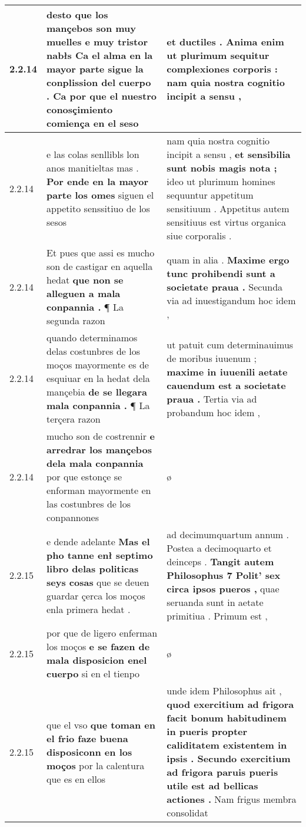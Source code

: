 \begin{tabular}{|p{1cm}|p{6.5cm}|p{6.5cm}|}
2.2.14 & desto que los mançebos son muy muelles e muy tristor nabłs \textbf{ Ca el alma en la mayor parte sigue la conplission del cuerpo . } Ca por que el nuestro conosçimiento comiença en el seso & et ductiles . \textbf{ Anima enim ut plurimum sequitur complexiones corporis : } nam quia nostra cognitio incipit a sensu , \\\hline
2.2.14 & e las colas senllibls lon anos manitieltas mas . \textbf{ Por ende en la mayor parte los omes } siguen el appetito senssitiuo de los sesos & nam quia nostra cognitio incipit a sensu , \textbf{ et sensibilia sunt nobis magis nota ; } ideo ut plurimum homines sequuntur appetitum sensitiuum . Appetitus autem sensitiuus est virtus organica siue corporalis . \\\hline
2.2.14 & Et pues que assi es mucho son de castigar en aquella hedat \textbf{ que non se alleguen a mala conpannia . } ¶ La segunda razon & quam in alia . \textbf{ Maxime ergo tunc prohibendi sunt a societate praua . } Secunda via ad inuestigandum hoc idem , \\\hline
2.2.14 & quando determinamos delas costunbres de los moços mayormente es de esquiuar en la hedat dela mançebia \textbf{ de se llegara mala conpannia . } ¶ La terçera razon & ut patuit cum determinauimus de moribus iuuenum ; \textbf{ maxime in iuuenili aetate cauendum est a societate praua . } Tertia via ad probandum hoc idem , \\\hline
2.2.14 & mucho son de costrennir \textbf{ e arredrar los mançebos dela mala conpannia } por que estonçe se enforman mayormente en las costunbres de los conpannones & ø \\\hline
2.2.15 & e dende adelante \textbf{ Mas el pho tanne enł septimo libro delas politicas seys cosas } que se deuen guardar çerca los moços enla primera hedat . & ad decimumquartum annum . Postea a decimoquarto et deinceps . \textbf{ Tangit autem Philosophus 7 Polit’ sex circa ipsos pueros , } quae seruanda sunt in aetate primitiua . Primum est , \\\hline
2.2.15 & por que de ligero enferman los moços \textbf{ e se fazen de mala disposicion enel cuerpo } si en el tienpo & ø \\\hline
2.2.15 & que el vso \textbf{ que toman en el frio faze buena disposiconn en los moços } por la calentura que es en ellos & unde idem Philosophus ait , \textbf{ quod exercitium ad frigora facit bonum habitudinem in pueris propter caliditatem existentem in ipsis . Secundo exercitium ad frigora paruis pueris utile est ad bellicas actiones . } Nam frigus membra consolidat \\\hline

\end{tabular}
